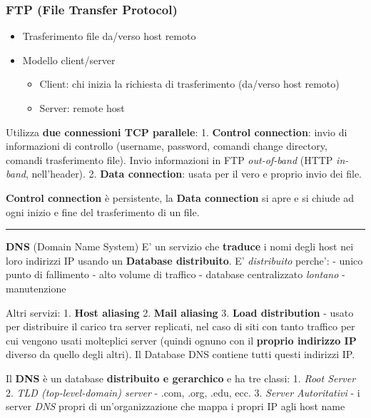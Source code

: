\hypertarget{ftp-file-transfer-protocol}{%
\subsubsection{FTP (File Transfer
Protocol)}\label{ftp-file-transfer-protocol}}

\begin{itemize}
\tightlist
\item
  Trasferimento file da/verso host remoto
\item
  Modello client/server

  \begin{itemize}
  \tightlist
  \item
    Client: chi inizia la richiesta di trasferimento (da/verso host
    remoto)
  \item
    Server: remote host
  \end{itemize}
\end{itemize}

Utilizza \textbf{due connessioni TCP parallele}: 1. \textbf{Control
connection}: invio di informazioni di controllo (username, password,
comandi change directory, comandi trasferimento file). Invio
informazioni in FTP \emph{out-of-band} (HTTP \emph{in-band},
nell'header). 2. \textbf{Data connection}: usata per il vero e proprio
invio dei file.

\textbf{Control connection} è persistente, la \textbf{Data connection}
si apre e si chiude ad ogni inizio e fine del trasferimento di un file.

\begin{center}\rule{0.5\linewidth}{\linethickness}\end{center}

\textbf{DNS} (Domain Name System) E' un servizio che \textbf{traduce} i
nomi degli host nei loro indirizzi IP usando un \textbf{Database
distribuito}. E' \emph{distribuito} perche': - unico punto di fallimento
- alto volume di traffico - database centralizzato \emph{lontano} -
manutenzione

Altri servizi: 1. \textbf{Host aliasing} 2. \textbf{Mail aliasing} 3.
\textbf{Load distribution} - usato per distribuire il carico tra server
replicati, nel caso di siti con tanto traffico per cui vengono usati
molteplici server (quindi ognuno con il \textbf{proprio indirizzo IP}
diverso da quello degli altri). Il Database DNS contiene tutti questi
indirizzi IP.

Il \textbf{DNS} è un database \textbf{distribuito e gerarchico} e ha tre
classi: 1. \emph{Root Server} 2. \emph{TLD (top-level-domain) server} -
.com, .org, .edu, ecc. 3. \emph{Server Autoritativi} - i server
\emph{DNS} propri di un'organizzazione che mappa i propri IP agli host
name


